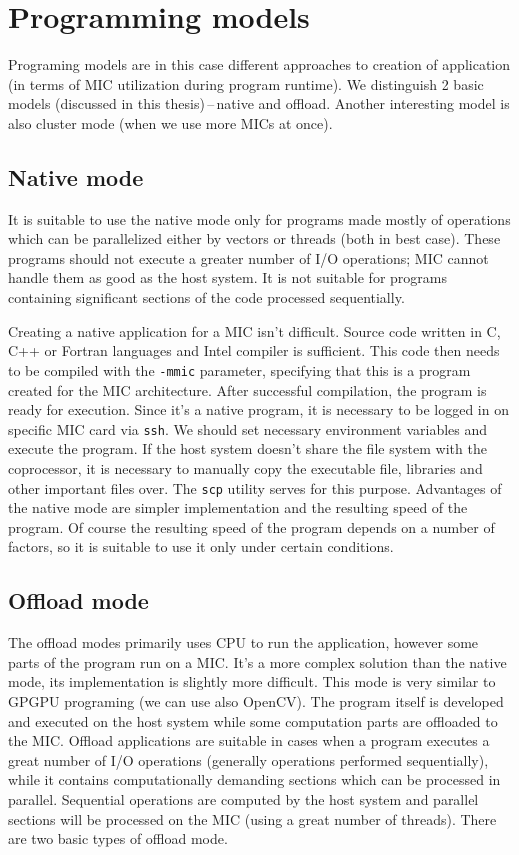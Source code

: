 \section{Programming models}
Programing models are in this case different approaches to creation of application (in terms of MIC utilization during program runtime). We distinguish 2 basic models (discussed in this thesis)\,--\,native and offload. Another interesting model is also cluster mode (when we use more MICs at once).

\subsection{Native mode}
It is suitable to use the native mode only for programs made mostly of operations which can be parallelized either by vectors or threads (both in best case). These programs should not execute a greater number of I/O operations; MIC cannot handle them as good as the host system. It is not suitable for programs containing significant sections of the code processed sequentially.

\par Creating a native application for a MIC isn't difficult. Source code written in C, C++ or Fortran languages and Intel compiler is sufficient. This code then needs to be compiled with the \texttt{-mmic} parameter, specifying that this is a program created for the MIC architecture. After successful compilation, the program is ready for execution. Since it's a native program, it is necessary to be logged in on specific MIC card via \texttt{ssh}. We should set necessary environment variables and execute the program. If the host system doesn't share the file system with the coprocessor, it is necessary to manually copy the executable file, libraries and other important  files over. The \texttt{scp} utility serves for this purpose. Advantages of the native mode are simpler implementation and the resulting speed of the program. Of course the resulting speed of the program depends on a number of factors, so it is suitable to use it only under certain conditions. 

\subsection{Offload mode}
The offload modes primarily uses CPU to run the application, however some parts of the program run on a MIC. It's a more complex solution than the native mode, its implementation is slightly more difficult. This mode is very similar to GPGPU programing (we can use also OpenCV). The program itself is developed and executed on the host system while some computation parts are offloaded to the MIC. Offload applications are suitable in cases when a program executes a great number of I/O operations (generally operations performed sequentially), while it contains computationally demanding sections which can be processed in parallel. Sequential operations are computed by the host system and parallel sections will be processed on the MIC (using a great number of threads). There are two basic types of offload mode.

